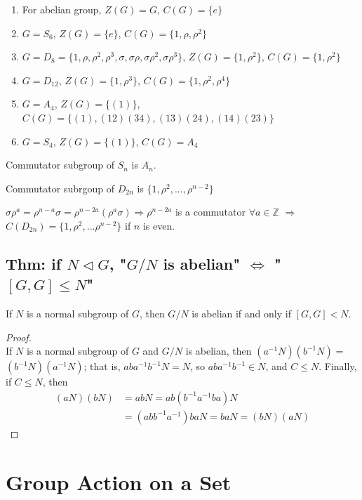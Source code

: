 \documentclass[11pt]{elegantbook}
\begin{document}
\begin{example}
\end{example}
\begin{enumerate}[(1)]
    \item For abelian group, $Z(G)=G$, $C(G)=\{e\}$
    \item $G=S_6$, $Z(G)=\{e\}$, $C(G)=\{1,\rho,\rho^2\}$
    \item $G=D_8=\{1,\rho,\rho^2,\rho^3,\sigma,\sigma\rho,\sigma\rho^2,\sigma\rho^3\}$, $Z(G)=\{1,\rho^2\}$, $C(G)=\{1,\rho^2\}$
    \item $G=D_{12}$, $Z(G)=\{1,\rho^3\}$, $C(G)=\{1,\rho^2,\rho^4\}$
    \item $G=A_4$, $Z(G)=\{(1)\}$, $C(G)=\{(1),(12)(34),(13)(24),(14)(23)\}$
    \item $G=S_4$, $Z(G)=\{(1)\}$, $C(G)=A_4$
\end{enumerate}
Commutator subgroup of $S_n$ is $A_n$.

Commutator subrgoup of $D_{2n}$ is $\{1,\rho^2,...,\rho^{n-2}\}$

$\sigma\rho^{a}=\rho^{n-a}\sigma=\rho^{n-2a}(\rho^{a}\sigma) \Rightarrow \rho^{n-2a}$ is a commutator $\forall a\in \mathbb{Z}$ $\Rightarrow$ $C(D_{2n})=\{1,\rho^2,...\rho^{n-2}\}$ if $n$ is even.

\subsection{Thm: if $N \lhd G$, "$G/N$ is abelian" $\Leftrightarrow$ "$[G,G] \leq N$"}
\begin{theorem}
    If $N$ is a normal subgroup of $G$, then $G/N$ is abelian if and only if $[G,G] < N$.
\end{theorem}
\begin{proof}
\quad\\
If $N$ is a normal subgroup of $G$ and $G / N$ is abelian, then $\left(a^{-1} N\right)\left(b^{-1} N\right)=$ $\left(b^{-1} N\right)\left(a^{-1} N\right)$; that is, $a b a^{-1} b^{-1} N=N$, so $a b a^{-1} b^{-1} \in N$, and $C \leq N$. Finally, if $C \leq N$, then
$$
\begin{aligned}
(a N)(b N) &=a b N=a b\left(b^{-1} a^{-1} b a\right) N \\
&=\left(a b b^{-1} a^{-1}\right) b a N=b a N=(b N)(a N)
\end{aligned}
$$
\end{proof}


\section{Group Action on a Set}
\end{document}
